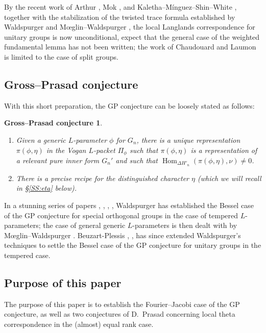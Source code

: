 \documentclass[11pt]{amsart}
\numberwithin{equation}{section}
\theoremstyle{plain}
\newtheorem*{GPconj}{Gross--Prasad conjecture}
\theoremstyle{definition}
\theoremstyle{remark}
\def\Hom{\operatorname{Hom}}
\begin{document}
By the recent work of Arthur \cite{a}, Mok \cite{mok}, and Kaletha--M\'inguez--Shin--White \cite{kmsw}, together with the stabilization of the twisted trace formula established by Waldspurger and M{\oe}glin--Waldspurger \cite{mw-2014}, the local Langlands correspondence for unitary groups is now unconditional, expect that the general case of the weighted fundamental lemma has not been written; the work of Chaudouard and Laumon \cite{cl} is limited to the case of split groups.

\subsection{Gross--Prasad conjecture}

With this short preparation, the GP conjecture can be loosely stated as follows:

\begin{GPconj}
\hfill
\begin{enumerate}
\item Given a generic $L$-parameter $\phi$ for $G_n$, there is a unique representation $\pi(\phi,\eta)$ in the Vogan $L$-packet $\Pi_{\phi}$ such that $\pi(\phi,\eta)$ is a representation of a relevant pure inner form $G_n'$ and such that $\Hom_{\Delta H'_n} (\pi(\phi,\eta), \nu)  \ne 0$.
\item There is a precise recipe for the distinguished character $\eta$ (which we will recall in \S \ref{SS:eta} below).
\end{enumerate}
\end{GPconj}

In a stunning series of papers \cite{w1}, \cite{w2}, \cite{w3}, \cite{w4}, Waldspurger has established the Bessel case of the GP conjecture for special orthogonal groups in the case of tempered $L$-parameters; the case of general generic $L$-parameters is then dealt with by M{\oe}glin--Waldspurger \cite{mw}. Beuzart-Plessis \cite{bp1}, \cite{bp2}, \cite{bp3} has since extended Waldspurger's techniques to settle the Bessel case of the GP conjecture for unitary groups in the tempered case.

\subsection{Purpose of this paper}

The purpose of this paper is to establish the Fourier--Jacobi case of the GP conjecture, as well as two conjectures of D.~Prasad concerning local theta correspondence in the (almost) equal rank case.
\end{document}
